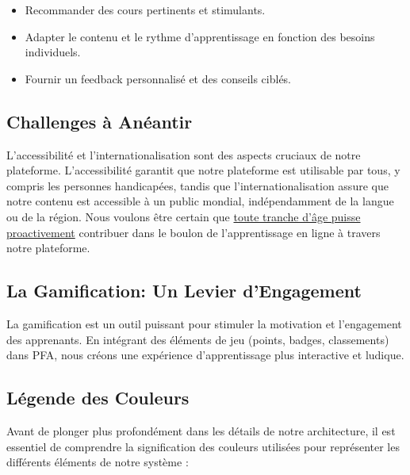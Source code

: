 \begin{itemize}
    \item Recommander des cours pertinents et stimulants. 
    \item Adapter le contenu et le rythme d'apprentissage en fonction des besoins individuels. 
    \item Fournir un feedback personnalisé et des conseils ciblés.
\end{itemize}

\subsection{ Challenges à Anéantir}

L'accessibilité et l'internationalisation sont des aspects cruciaux de notre plateforme. L'accessibilité garantit que notre plateforme est utilisable par tous, y compris les personnes handicapées, tandis que l'internationalisation assure que notre contenu est accessible à un public mondial, indépendamment de la langue ou de la région.
\smallbreak Nous voulons être certain que  \underline {toute tranche d'âge puisse proactivement} contribuer dans le boulon de l'apprentissage en ligne à travers notre plateforme.

\subsection{La Gamification: Un Levier d'Engagement}

La \gls{gamification} est un outil puissant pour stimuler la motivation et l'engagement des apprenants. En intégrant des éléments de jeu (points, badges, classements) dans PFA, nous créons une expérience d'apprentissage plus interactive et ludique.


\subsection{Légende des Couleurs}

Avant de plonger plus profondément dans les détails de notre architecture, il est essentiel de comprendre la signification des couleurs utilisées pour représenter les différents éléments de notre système :

